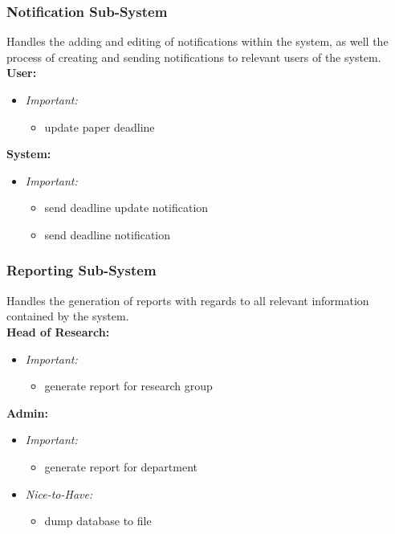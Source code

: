 \documentclass{article}
\begin{document}
			\subsubsection{Notification Sub-System}\label{subsubsec:priority-notification}
				Handles the adding and editing of notifications within the system, as well the process of creating and sending notifications to relevant users of the system.\\
				[3mm]
				\textbf{User:}
				\begin{itemize}					
					\item \textit{Important:}
					\begin{itemize}
						\item update paper deadline
					\end{itemize}
				\end{itemize}
				\textbf{System:}
				\begin{itemize}
					\item \textit{Important:}
					\begin{itemize}
						\item send deadline update notification
						\item send deadline notification
					\end{itemize}
				\end{itemize}
			\subsubsection{Reporting Sub-System}\label{subsubsec:priority-report}
				Handles the generation of reports with regards to all relevant information contained by the system.\\
				[3mm]
				\textbf{Head of Research:}
				\begin{itemize}					
					\item \textit{Important:}
					\begin{itemize}
						\item generate report for research group
					\end{itemize}
				\end{itemize}
				\textbf{Admin:}
				\begin{itemize}
					\item \textit{Important:}
					\begin{itemize}
						\item generate report for department
					\end{itemize}
					\item \textit{Nice-to-Have:}
					\begin{itemize}
						\item dump database to file
					\end{itemize}
				\end{itemize}
\end{document}
